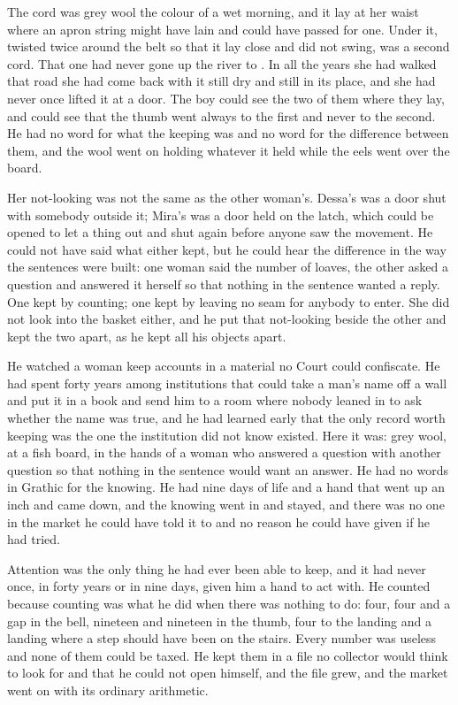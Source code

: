 The cord was grey wool the colour of a wet morning, and it lay at her waist where an apron string might have lain and could have passed for one. Under it, twisted twice around the belt so that it lay close and did not swing, was a second cord. That one had never gone up the river to . In all the years she had walked that road she had come back with it still dry and still in its place, and she had never once lifted it at a door. The boy could see the two of them where they lay, and could see that the thumb went always to the first and never to the second. He had no word for what the keeping was and no word for the difference between them, and the wool went on holding whatever it held while the eels went over the board.

Her not-looking was not the same as the other woman's. Dessa's was a door shut with somebody outside it; Mira's was a door held on the latch, which could be opened to let a thing out and shut again before anyone saw the movement. He could not have said what either kept, but he could hear the difference in the way the sentences were built: one woman said the number of loaves, the other asked a question and answered it herself so that nothing in the sentence wanted a reply. One kept by counting; one kept by leaving no seam for anybody to enter. She did not look into the basket either, and he put that not-looking beside the other and kept the two apart, as he kept all his objects apart.

He watched a woman keep accounts in a material no Court could confiscate. He had spent forty years among institutions that could take a man's name off a wall and put it in a book and send him to a room where nobody leaned in to ask whether the name was true, and he had learned early that the only record worth keeping was the one the institution did not know existed. Here it was: grey wool, at a fish board, in the hands of a woman who answered a question with another question so that nothing in the sentence would want an answer. He had no words in Grathic for the knowing. He had nine days of life and a hand that went up an inch and came down, and the knowing went in and stayed, and there was no one in the market he could have told it to and no reason he could have given if he had tried.

Attention was the only thing he had ever been able to keep, and it had never once, in forty years or in nine days, given him a hand to act with. He counted because counting was what he did when there was nothing to do: four, four and a gap in the bell, nineteen and nineteen in the thumb, four to the landing and a landing where a step should have been on the stairs. Every number was useless and none of them could be taxed. He kept them in a file no collector would think to look for and that he could not open himself, and the file grew, and the market went on with its ordinary arithmetic.

